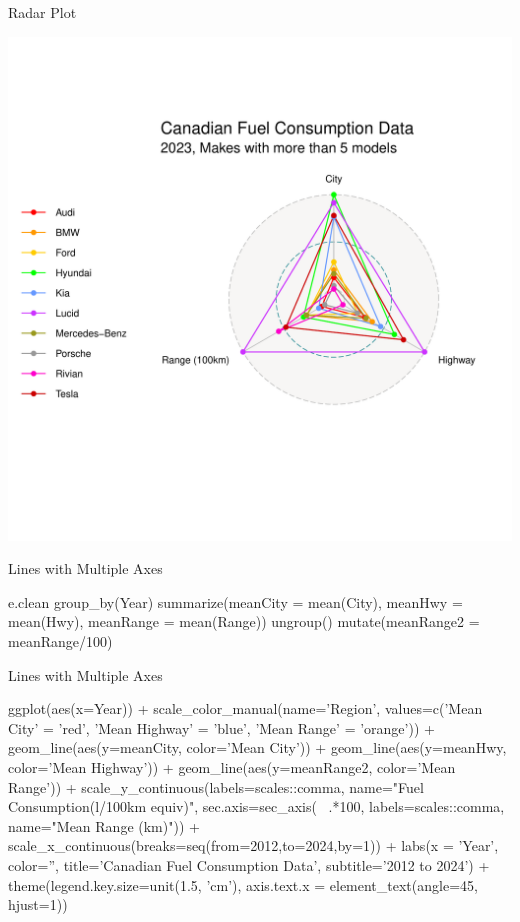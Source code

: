 \documentclass[ignorenonframetext,xcolor=x11names]{beamer}
\begin{document}
\begin{frame}{Radar Plot}
\centering

  \includegraphics[width=.9\textwidth]{fuel.radar.pdf}
\end{frame}

\begin{frame}[fragile]{Lines with Multiple Axes}
\footnotesize
\begin{Rcode}
e.clean %
   group_by(Year) %
   summarize(meanCity = mean(City), 
             meanHwy = mean(Hwy), 
             meanRange = mean(Range)) %
   ungroup() %
   mutate(meanRange2 = meanRange/100) %
\end{Rcode}
\end{frame}

\begin{frame}[fragile]{Lines with Multiple Axes}
\footnotesize
\begin{Rcode}
ggplot(aes(x=Year)) +
  scale_color_manual(name='Region', 
     values=c('Mean City' = 'red', 
              'Mean Highway' = 'blue', 
              'Mean Range' = 'orange')) +
  geom_line(aes(y=meanCity, color='Mean City')) + 
  geom_line(aes(y=meanHwy, color='Mean Highway')) +
  geom_line(aes(y=meanRange2, color='Mean Range')) +
  scale_y_continuous(labels=scales::comma, 
      name="Fuel Consumption\n(l/100km equiv)", 
      sec.axis=sec_axis(~ .*100, 
                        labels=scales::comma, 
                        name="Mean Range (km)")) + 
  scale_x_continuous(breaks=seq(from=2012,to=2024,by=1)) + 
  labs(x = 'Year', color='',
       title='Canadian Fuel Consumption Data', 
       subtitle='2012 to 2024') +
  theme(legend.key.size=unit(1.5, 'cm'), 
        axis.text.x = element_text(angle=45, hjust=1))
\end{Rcode}
\end{frame}
\end{document}

